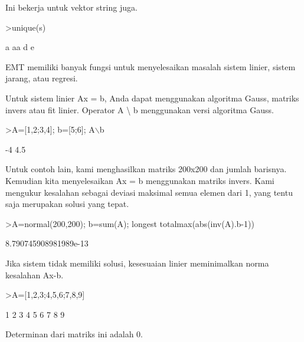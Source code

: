 \documentclass[a4paper,10pt]{article}
\begin{document}
\begin{eulernotebook}
\begin{eulercomment}
\begin{eulercomment}
\begin{eulercomment}
\begin{eulercomment}
\begin{eulercomment}
\begin{eulercomment}
\begin{eulercomment}
Ini bekerja untuk vektor string juga.
\end{eulercomment}
\begin{eulerprompt}
>unique(s)
\end{eulerprompt}
\begin{euleroutput}
  a
  aa
  d
  e
\end{euleroutput}
\begin{eulercomment}
EMT memiliki banyak fungsi untuk menyelesaikan masalah sistem linier,
sistem jarang, atau regresi.

Untuk sistem linier Ax = b, Anda dapat menggunakan algoritma Gauss,
matriks invers atau fit linier. Operator A \textbackslash{} b menggunakan versi
algoritma Gauss.
\end{eulercomment}
\begin{eulerprompt}
>A=[1,2;3,4]; b=[5;6]; A\(\backslash\)b
\end{eulerprompt}
\begin{euleroutput}
             -4 
            4.5 
\end{euleroutput}
\begin{eulercomment}
Untuk contoh lain, kami menghasilkan matriks 200x200 dan jumlah
barisnya. Kemudian kita menyelesaikan Ax = b menggunakan matriks
invers. Kami mengukur kesalahan sebagai deviasi maksimal semua elemen
dari 1, yang tentu saja merupakan solusi yang tepat.
\end{eulercomment}
\begin{eulerprompt}
>A=normal(200,200); b=sum(A); longest totalmax(abs(inv(A).b-1))
\end{eulerprompt}
\begin{euleroutput}
    8.790745908981989e-13 
\end{euleroutput}
\begin{eulercomment}
Jika sistem tidak memiliki solusi, kesesuaian linier meminimalkan
norma kesalahan Ax-b.
\end{eulercomment}
\begin{eulerprompt}
>A=[1,2,3;4,5,6;7,8,9]
\end{eulerprompt}
\begin{euleroutput}
              1             2             3 
              4             5             6 
              7             8             9 
\end{euleroutput}
\begin{eulercomment}
Determinan dari matriks ini adalah 0.
\end{eulercomment}
\begin{eulerprompt}

\end{eulerprompt}
\end{eulercomment}
\end{eulercomment}
\end{eulercomment}
\end{eulercomment}
\end{eulercomment}
\end{eulercomment}
\end{eulernotebook}
\end{document}
